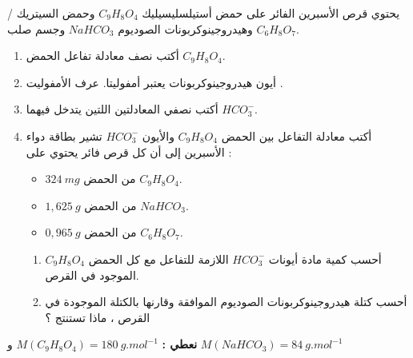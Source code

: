 \documentclass[14pt,a4paper]{extarticle}
\begin{document}
{\begin{exercice}{}/
يحتوي قرص الأسبرين الفائر على حمض
أستيلسليسيليك 
$C_9H_8O_4$
وحمض السيتريك
$C_6H_8O_7$
وهيدروجينوكربونات الصوديوم
$NaHCO_3$
وجسم صلب.
\begin{enumerate}
\item أكتب نصف معادلة تفاعل الحمض
$C_9H_8O_4$.
\item أيون هيدروجينوكربونات يعتبر أمفوليتا. عرف
الأمفوليت .
\item أكتب نصفي المعادلتين اللتين يتدخل فيهما
$HCO_3^{-}$.
\item أكتب معادلة التفاعل بين الحمض
$C_9H_8O_4$
والأيون
$HCO_3^{-}$
تشير بطاقة دواء الأسبرين إلى أن كل قرص فائر
يحتوي على :
\begin{itemize}
\item $324\ mg$
من الحمض
$C_9H_8O_4$.
\item $1,625\ g$
من الحمض
$NaHCO_3$.
\item $0,965\ g$
من الحمض
$C_6H_8O_7$.
\end{itemize}
\begin{enumerate}
\item  أحسب كمية مادة أيونات
$HCO_3^{-}$
اللازمة
للتفاعل مع كل الحمض
$C_9H_8O_4$
الموجود في القرص.
\item أحسب كتلة هيدروجينوكربونات الصوديوم
الموافقة وقارنها بالكتلة الموجودة في القرص ، ماذا
تستنتج ؟
\end{enumerate}
\end{enumerate}
\textbf{نعطي :}
$M(C_9H_8O_4) = 180\ g.mol^{-1}$
و
$M(NaHCO_3) = 84\ g.mol^{-1}$
\end{exercice}{}
}
\end{document}
